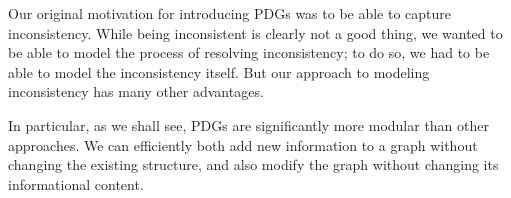 \documentclass{article}
\newcommand{\MN}{PDG}
\numberwithin{equation}{section}
\begin{document}
Our original motivation for introducing PDGs was to be able to capture
inconsistency.  
While being inconsistent is clearly not a good thing,
we wanted to be able to model the process of resolving inconsistency;
to do so, we had to be able to model the inconsistency itself.  
But our approach to modeling inconsistency has many other advantages.
	
In particular, as we shall see, \MN s are significantly more modular
than other approaches.
We can efficiently both add new information to a graph
without changing the existing structure, 
and also modify the graph without changing its informational content.
\end{document}

